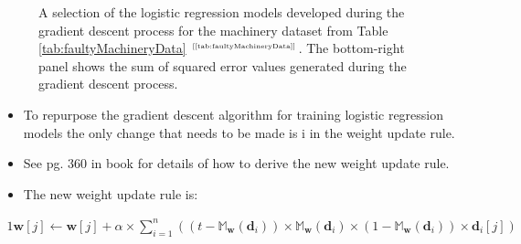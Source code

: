 \documentclass[xcolor={table}]{beamer}
\newcommand{\ourRef}[1]{\ref{#1} $^{\text{\tiny[\pageref{#1}]}}$}
\begin{document}
\begin{frame}
\begin{figure}[htb]
\begin{center}
\caption{A selection of the logistic regression models developed during the gradient descent process for the machinery dataset from Table \ourRef{tab:faultyMachineryData}. The bottom-right panel shows the sum of squared error values generated during the gradient descent process.}
\label{fig:machineryGoodSepGradientDescentSmallMultiples}
\end{center}
\end{figure}
\end{frame} 

\begin{frame} 
\begin{itemize}
\item To repurpose the gradient descent algorithm for training logistic regression models the only change that needs to be made is i in the weight update rule. 
\item See pg. 360 in book for details of how to derive the new weight update rule.
\item The new weight update rule is:
\end{itemize}
\begin{alignat*}{1}
	\mathbf{w}[j] \leftarrow \mathbf{w}[j] + \alpha \times \sum_{i=1}^{n} \left(\left(t - \mathbb{M}_{\mathbf{w}}(\mathbf{d}_i)\right) \times  \mathbb{M}_{\mathbf{w}}(\mathbf{d}_i) \times (1 - \mathbb{M}_{\mathbf{w}}(\mathbf{d}_i)) \times \mathbf{d}_i[j]\right)
	\label{eqn:logisticWeightUpdateRule}
\end{alignat*}
\end{frame} 
\end{document}
